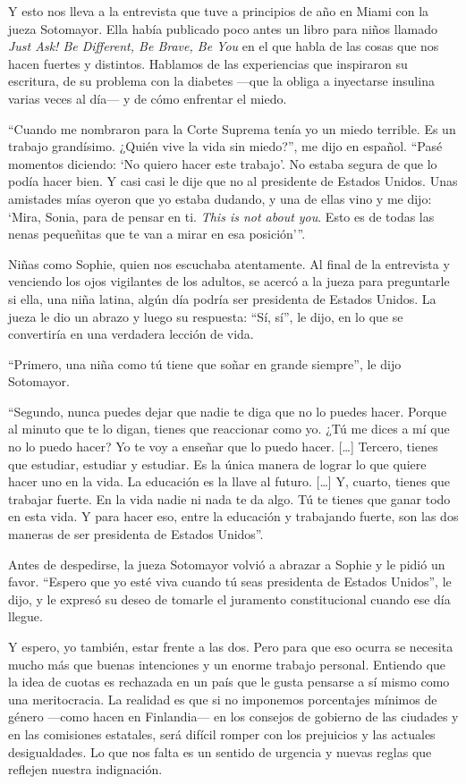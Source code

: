 Y esto nos lleva a la entrevista que tuve a principios de año en Miami
con la jueza Sotomayor. Ella había publicado poco antes un libro para
niños llamado \emph{Just Ask! Be Different, Be Brave, Be You} en el que
habla de las cosas que nos hacen fuertes y distintos. Hablamos de las
experiencias que inspiraron su escritura, de su problema con la diabetes
---que la obliga a inyectarse insulina varias veces al día--- y de cómo
enfrentar el miedo.

``Cuando me nombraron para la Corte Suprema tenía yo un miedo terrible.
Es un trabajo grandísimo. ¿Quién vive la vida sin miedo?'', me dijo en
español. ``Pasé momentos diciendo: `No quiero hacer este trabajo'. No
estaba segura de que lo podía hacer bien. Y casi casi le dije que no al
presidente de Estados Unidos. Unas amistades mías oyeron que yo estaba
dudando, y una de ellas vino y me dijo: `Mira, Sonia, para de pensar en
ti. \emph{This is not about you}. Esto es de todas las nenas pequeñitas
que te van a mirar en esa posición'''.

Niñas como Sophie, quien nos escuchaba atentamente. Al final de la
entrevista y venciendo los ojos vigilantes de los adultos, se acercó a
la jueza para preguntarle si ella, una niña latina, algún día podría ser
presidenta de Estados Unidos. La jueza le dio un abrazo y luego su
respuesta: ``Sí, sí'', le dijo, en lo que se convertiría en una
verdadera lección de vida.

``Primero, una niña como tú tiene que soñar en grande siempre'', le dijo
Sotomayor.

``Segundo, nunca puedes dejar que nadie te diga que no lo puedes hacer.
Porque al minuto que te lo digan, tienes que reaccionar como yo. ¿Tú me
dices a mí que no lo puedo hacer? Yo te voy a enseñar que lo puedo
hacer. {[}\ldots{]} Tercero, tienes que estudiar, estudiar y estudiar.
Es la única manera de lograr lo que quiere hacer uno en la vida. La
educación es la llave al futuro. {[}\ldots{]} Y, cuarto, tienes que
trabajar fuerte. En la vida nadie ni nada te da algo. Tú te tienes que
ganar todo en esta vida. Y para hacer eso, entre la educación y
trabajando fuerte, son las dos maneras de ser presidenta de Estados
Unidos''.

Antes de despedirse, la jueza Sotomayor volvió a abrazar a Sophie y le
pidió un favor. ``Espero que yo esté viva cuando tú seas presidenta de
Estados Unidos'', le dijo, y le expresó su deseo de tomarle el juramento
constitucional cuando ese día llegue.

Y espero, yo también, estar frente a las dos. Pero para que eso ocurra
se necesita mucho más que buenas intenciones y un enorme trabajo
personal. Entiendo que la idea de cuotas es rechazada en un país que le
gusta pensarse a sí mismo como una meritocracia. La realidad es que si
no imponemos porcentajes mínimos de género ---como hacen en Finlandia---
en los consejos de gobierno de las ciudades y en las comisiones
estatales, será difícil romper con los prejuicios y las actuales
desigualdades. Lo que nos falta es un sentido de urgencia y nuevas
reglas que reflejen nuestra indignación.

